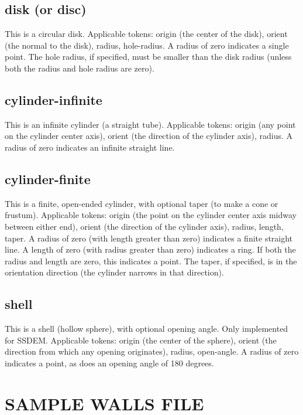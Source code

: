 \subsection{disk (or disc)}

This is a circular disk.  Applicable tokens: origin (the center of the
disk), orient (the normal to the disk), radius, hole-radius.  A radius
of zero indicates a single point.  The hole radius, if specified, must
be smaller than the disk radius (unless both the radius and hole
radius are zero).

\subsection{cylinder-infinite}

This is an infinite cylinder (a straight tube).  Applicable tokens:
origin (any point on the cylinder center axis), orient (the direction
of the cylinder axis), radius.  A radius of zero indicates an infinite
straight line.

\subsection{cylinder-finite}

This is a finite, open-ended cylinder, with optional taper (to make a
cone or frustum).  Applicable tokens: origin (the point on the
cylinder center axis midway between either end), orient (the direction
of the cylinder axis), radius, length, taper.  A radius of zero (with
length greater than zero) indicates a finite straight line.  A length
of zero (with radius greater than zero) indicates a ring.  If both the
radius and length are zero, this indicates a point.  The taper, if
specified, is in the orientation direction (\ie the cylinder narrows
in that direction).

\subsection{shell}

This is a shell (hollow sphere), with optional opening angle.  Only
implemented for SSDEM.  Applicable tokens: origin (the center of the
sphere), orient (the direction from which any opening originates),
radius, open-angle.  A radius of zero indicates a point, as does an
opening angle of 180 degrees.

\section{SAMPLE WALLS FILE}

